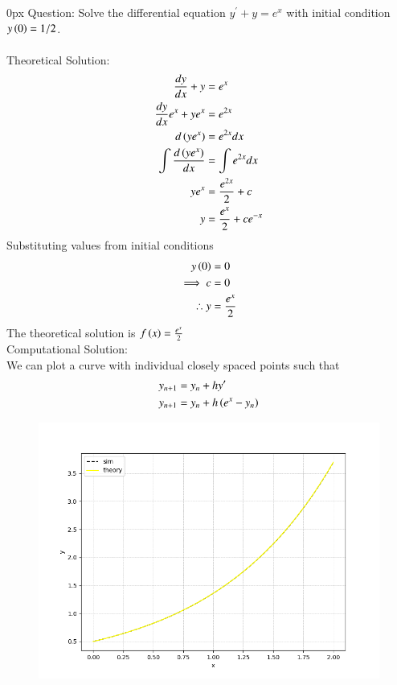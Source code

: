 \documentclass[journal,12pt,onecolumn]{IEEEtran}
\theoremstyle{remark}
\begin{document}
\title{}
\author{EE24BTECH11007 - Arnav Makarand Yadnopavit}
\maketitle
\renewcommand{\thefigure}{\theenumi}
\renewcommand{\thetable}{\theenumi}
\parindent 0px Question: Solve the differential equation $y^\prime+y=e^x$ with initial condition $y\left(0\right)=1/2$. \\
\solution\\
Theoretical Solution:\\
\begin{align}
    \frac{dy}{dx}+y&=e^x\\
    \frac{dy}{dx} e^x+ye^x&=e^{2x}\\
    d\left(ye^x\right)&=e^{2x}dx\\
    \int \frac{d\left(ye^x\right)}{dx}&=\int e^{2x}dx\\
    ye^x&=\frac{e^{2x}}{2}+c\\
    y&=\frac{e^x}{2}+ce^{-x}
\end{align}
Substituting values from initial conditions
\begin{align}
    y\left(0\right)&=0\\
    \implies c&=0\\
    \therefore y&=\frac{e^x}{2}
\end{align}
The theoretical solution is $f\left(x\right)=\frac{e^x}{2}$\\
Computational Solution:\\
We can plot a curve with individual closely spaced points such that
\begin{align}
    y_{n+1}&=y_n+hy^\prime\\
    y_{n+1}&=y_n+h\left(e^x-y_n\right)
\end{align}
\begin{figure}[h]
    \centering
    \includegraphics[width=\columnwidth]{figs/fig.png}
 \end{figure}
\end{document}
